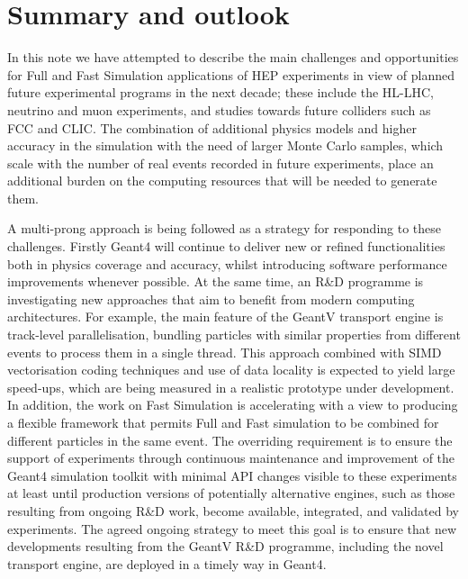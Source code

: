\documentclass[12pt,a4paper]{article}
\begin{document}
{\hypertarget{summary-and-outlook}{%
\section{Summary and outlook}\label{summary-and-outlook}}

In this note we have attempted to describe the main challenges and
opportunities for Full and Fast Simulation applications of HEP
experiments in view of planned future experimental programs in the next
decade; these include the HL-LHC, neutrino and muon experiments, and
studies towards future colliders such as FCC and CLIC. The combination
of additional physics models and higher accuracy in the simulation with
the need of larger Monte Carlo samples, which scale with the number of
real events recorded in future experiments, place an additional burden
on the computing resources that will be needed to generate them.

A multi-prong approach is being followed as a strategy for responding to
these challenges. Firstly Geant4 will continue to deliver new or refined
functionalities both in physics coverage and accuracy, whilst
introducing software performance improvements whenever possible. At the
same time, an R\&D programme is investigating new approaches that aim to
benefit from modern computing architectures. For example, 
the main feature of the GeantV transport engine is
track-level parallelisation, bundling particles with similar properties
from different events to process them in a single thread. This approach
combined with SIMD vectorisation coding techniques and use of data
locality is expected to yield large speed-ups, which are being measured
in a realistic prototype under development. In addition, the work on
Fast Simulation is accelerating with a view to producing a flexible
framework that permits Full and Fast simulation to be combined for
different particles in the same event. The overriding requirement is to
ensure the support of experiments through continuous maintenance 
and improvement of the Geant4 simulation toolkit with minimal
API changes visible to these experiments at least until production
versions of potentially alternative engines, such as those resulting
from ongoing R\&D work, become available, integrated, and validated by
experiments. The agreed ongoing strategy to meet this goal is to ensure
that new developments resulting from the GeantV R\&D programme,
including the novel transport engine, are
deployed in a timely way in Geant4.

}
\end{document}
